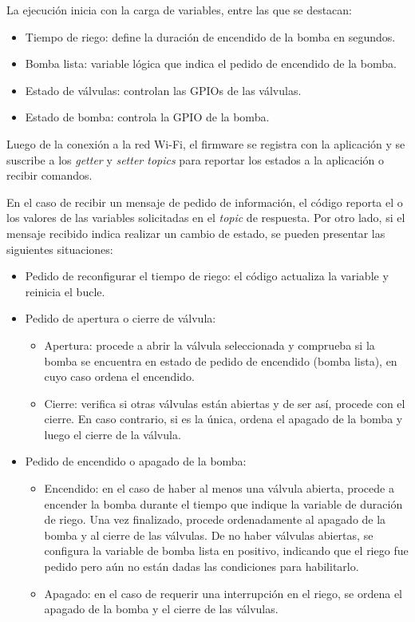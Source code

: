 La ejecución inicia con la carga de variables, entre las que se destacan:
\begin{itemize}
\item Tiempo de riego: define la duración de encendido de la bomba en segundos.
\item Bomba lista: variable lógica que indica el pedido de encendido de la bomba.
\item Estado de válvulas: controlan las GPIOs de las válvulas.
\item Estado de bomba: controla la GPIO de la bomba.
\end{itemize}

Luego de la conexión a la red Wi-Fi, el firmware se registra con la aplicación y se suscribe a los \textit{getter} y \textit{setter topics} para reportar los estados a la aplicación o recibir comandos.



En el caso de recibir un mensaje de pedido de información, el código reporta el o los valores de las variables solicitadas en el \textit{topic} de respuesta. Por otro lado, si el mensaje recibido indica realizar un cambio de estado, se pueden presentar las siguientes situaciones:
\pagebreak

\begin{itemize}
\item Pedido de reconfigurar el tiempo de riego: el código actualiza la variable y reinicia el bucle.

\item Pedido de apertura o cierre de válvula:
    \begin{itemize}
    \item Apertura: procede a abrir la válvula seleccionada y  comprueba si la bomba se encuentra en estado de pedido de encendido (bomba lista), en cuyo caso ordena el encendido.
    \item Cierre: verifica si otras válvulas están abiertas y de ser así, procede con el cierre. En caso contrario, si es la única, ordena el apagado de la bomba y luego el cierre de la válvula.
    
    \end{itemize}

\item Pedido de encendido o apagado de la bomba:
    \begin{itemize}
    \item Encendido: en el caso de haber al menos una válvula abierta, procede a encender la bomba durante el tiempo que indique la variable de duración de riego. Una vez finalizado, procede ordenadamente al apagado de la bomba y al cierre de las válvulas. De no haber válvulas abiertas, se configura la variable de bomba lista en positivo, indicando que el riego fue pedido pero aún no están dadas las condiciones para habilitarlo.
    \item Apagado: en el caso de requerir una interrupción en el riego, se ordena el apagado de la bomba y el cierre de las válvulas.
    
    \end{itemize}



\end{itemize}




